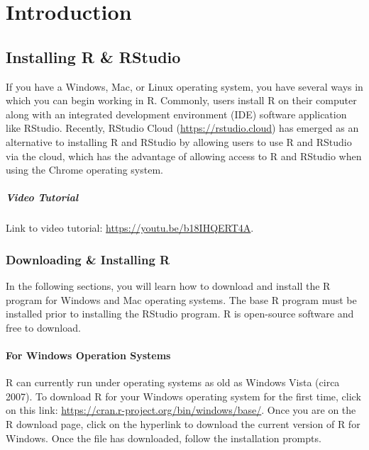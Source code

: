 \documentclass[]{book}
\begin{document}
\part{Introduction}\label{part-introduction}

\chapter{Installing R \& RStudio}\label{install}

If you have a Windows, Mac, or Linux operating system, you have several
ways in which you can begin working in R. Commonly, users install R on
their computer along with an integrated development environment (IDE)
software application like RStudio. Recently, RStudio Cloud
(\url{https://rstudio.cloud}) has emerged as an alternative to
installing R and RStudio by allowing users to use R and RStudio via the
cloud, which has the advantage of allowing access to R and RStudio when
using the Chrome operating system.

\subsubsection{Video Tutorial}\label{video-tutorial}

Link to video tutorial: \url{https://youtu.be/b18IHQERT4A}.

\section{Downloading \& Installing R}\label{downloading-installing-r}

In the following sections, you will learn how to download and install
the R program for Windows and Mac operating systems. The base R program
must be installed prior to installing the RStudio program. R is
open-source software and free to download.

\subsection{For Windows Operation
Systems}\label{for-windows-operation-systems}

R can currently run under operating systems as old as Windows Vista
(circa 2007). To download R for your Windows operating system for the
first time, click on this link:
\url{https://cran.r-project.org/bin/windows/base/}. Once you are on the
R download page, click on the hyperlink to download the current version
of R for Windows. Once the file has downloaded, follow the installation
prompts.
\end{document}
